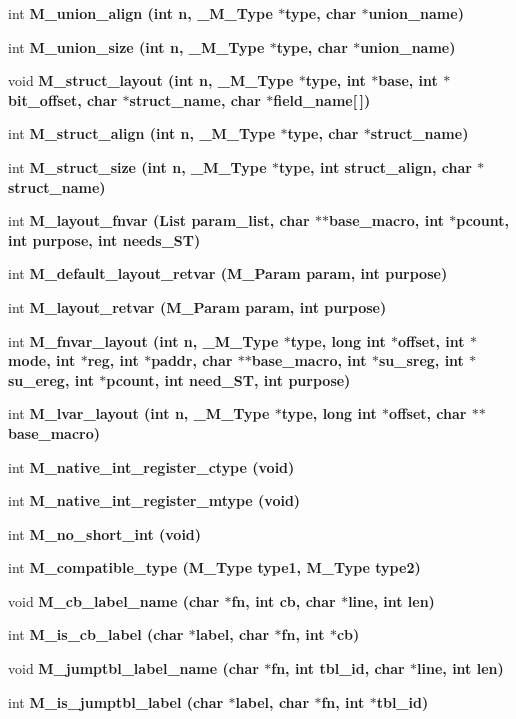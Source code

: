 \begin{CompactItemize}
int \bf{M\_\-union\_\-align} (int n, \bf{\_\-M\_\-Type} $\ast$type, char $\ast$union\_\-name)
\item 
int \bf{M\_\-union\_\-size} (int n, \bf{\_\-M\_\-Type} $\ast$type, char $\ast$union\_\-name)
\item 
void \bf{M\_\-struct\_\-layout} (int n, \bf{\_\-M\_\-Type} $\ast$type, int $\ast$base, int $\ast$bit\_\-offset, char $\ast$struct\_\-name, char $\ast$field\_\-name[$\,$])
\item 
int \bf{M\_\-struct\_\-align} (int n, \bf{\_\-M\_\-Type} $\ast$type, char $\ast$struct\_\-name)
\item 
int \bf{M\_\-struct\_\-size} (int n, \bf{\_\-M\_\-Type} $\ast$type, int struct\_\-align, char $\ast$struct\_\-name)
\item 
int \bf{M\_\-layout\_\-fnvar} (\bf{List} param\_\-list, char $\ast$$\ast$base\_\-macro, int $\ast$pcount, int purpose, int needs\_\-ST)
\item 
int \bf{M\_\-default\_\-layout\_\-retvar} (\bf{M\_\-Param} param, int purpose)
\item 
int \bf{M\_\-layout\_\-retvar} (\bf{M\_\-Param} param, int purpose)
\item 
int \bf{M\_\-fnvar\_\-layout} (int n, \bf{\_\-M\_\-Type} $\ast$type, long int $\ast$offset, int $\ast$\bf{mode}, int $\ast$reg, int $\ast$paddr, char $\ast$$\ast$base\_\-macro, int $\ast$su\_\-sreg, int $\ast$su\_\-ereg, int $\ast$pcount, int need\_\-ST, int purpose)
\item 
int \bf{M\_\-lvar\_\-layout} (int n, \bf{\_\-M\_\-Type} $\ast$type, long int $\ast$offset, char $\ast$$\ast$base\_\-macro)
\item 
int \bf{M\_\-native\_\-int\_\-register\_\-ctype} (void)
\item 
int \bf{M\_\-native\_\-int\_\-register\_\-mtype} (void)
\item 
int \bf{M\_\-no\_\-short\_\-int} (void)
\item 
int \bf{M\_\-compatible\_\-type} (\bf{M\_\-Type} type1, \bf{M\_\-Type} type2)
\item 
void \bf{M\_\-cb\_\-label\_\-name} (char $\ast$fn, int cb, char $\ast$line, int len)
\item 
int \bf{M\_\-is\_\-cb\_\-label} (char $\ast$label, char $\ast$fn, int $\ast$cb)
\item 
void \bf{M\_\-jumptbl\_\-label\_\-name} (char $\ast$fn, int tbl\_\-id, char $\ast$line, int len)
\item 
int \bf{M\_\-is\_\-jumptbl\_\-label} (char $\ast$label, char $\ast$fn, int $\ast$tbl\_\-id)
$$
\end{CompactItemize}
